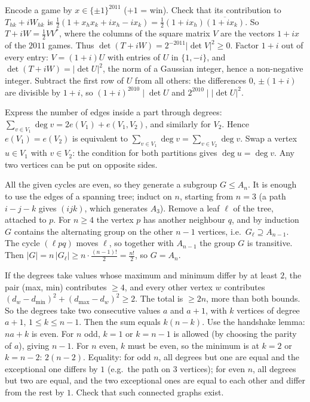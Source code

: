 \documentclass[11pt,a4paper]{article}
\begin{document}
Encode a game by \(x\in\{\pm1\}^{2011}\) (\(+1\) = win). Check that its contribution to \(T_{hk}+iW_{hk}\) is \(\frac12(1+x_hx_k+ix_h-ix_k)=\frac12(1+ix_h)\overline{(1+ix_k)}\).
So \(T+iW=\frac12VV^*\), where the columns of the square matrix \(V\) are the vectors \(1+ix\) of the \(2011\) games. Thus \(\det(T+iW)=2^{-2011}\lvert\det V\rvert^2\ge0\).
Factor \(1+i\) out of every entry: \(V=(1+i)U\) with entries of \(U\) in \(\{1,-i\}\), and \(\det(T+iW)=\lvert\det U\rvert^2\), the norm of a Gaussian integer, hence a non-negative integer.
Subtract the first row of \(U\) from all others: the differences \(0\), \(\pm(1+i)\) are divisible by \(1+i\), so \((1+i)^{2010}\mid\det U\) and \(2^{2010}\mid\lvert\det U\rvert^2\).

Express the number of edges inside a part through degrees: \(\sum_{v\in V_1}\deg v=2e(V_1)+e(V_1,V_2)\), and similarly for \(V_2\).
Hence \(e(V_1)=e(V_2)\) is equivalent to \(\sum_{v\in V_1}\deg v=\sum_{v\in V_2}\deg v\). Swap a vertex \(u\in V_1\) with \(v\in V_2\): the condition for both partitions gives \(\deg u=\deg v\). Any two vertices can be put on opposite sides.

All the given cycles are even, so they generate a subgroup \(G\le A_n\). It is enough to use the edges of a spanning tree; induct on \(n\), starting from \(n=3\) (a path \(i\!-\!j\!-\!k\) gives \((ijk)\), which generates \(A_3\)).
Remove a leaf \(\ell\) of the tree, attached to \(p\). For \(n\ge4\) the vertex \(p\) has another neighbour \(q\), and by induction \(G\) contains the alternating group on the other \(n-1\) vertices, i.e.\ \(G_\ell\supseteq A_{n-1}\).
The cycle \((\ell pq)\) moves \(\ell\), so together with \(A_{n-1}\) the group \(G\) is transitive. Then \(|G|=n\,|G_\ell|\ge n\cdot\frac{(n-1)!}2=\frac{n!}2\), so \(G=A_n\).

If the degrees take values whose maximum and minimum differ by at least \(2\), the pair (max, min) contributes \(\ge4\), and every other vertex \(w\) contributes \((d_w-d_{\min})^2+(d_{\max}-d_w)^2\ge2\). The total is \(\ge2n\), more than both bounds.
So the degrees take two consecutive values \(a\) and \(a+1\), with \(k\) vertices of degree \(a+1\), \(1\le k\le n-1\). Then the sum equals \(k(n-k)\).
Use the handshake lemma: \(na+k\) is even. For \(n\) odd, \(k=1\) or \(k=n-1\) is allowed (by choosing the parity of \(a\)), giving \(n-1\). For \(n\) even, \(k\) must be even, so the minimum is at \(k=2\) or \(k=n-2\): \(2(n-2)\).
Equality: for odd \(n\), all degrees but one are equal and the exceptional one differs by \(1\) (e.g.\ the path on \(3\) vertices); for even \(n\), all degrees but two are equal, and the two exceptional ones are equal to each other and differ from the rest by \(1\). Check that such connected graphs exist.
\end{document}
